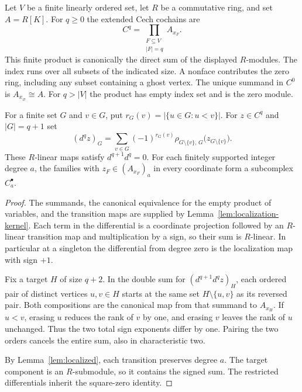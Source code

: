 \begin{lemma}\label{lem:cech-complex}
Let $V$ be a finite linearly ordered set, let $R$ be a commutative ring,
and set $A=R[K]$. For $q\geq0$ the extended Cech cochains are
\[
 C^q=\prod_{\substack{F\subseteq V\\ |F|=q}} A_{x_F}.
\]
This finite product is canonically the direct sum of the displayed
$R$-modules. The index runs over all subsets of the indicated size.
A nonface contributes the zero ring, including any subset containing a
ghost vertex. The unique summand in $C^0$ is $A_{x_\varnothing}\cong A$.
For $q>|V|$ the product has empty index set and is the zero module.

For a finite set $G$ and $v\in G$, put
$r_G(v)=|\{u\in G:u<v\}|$. For $z\in C^q$ and $|G|=q+1$ set
\[
 (d^q z)_G=\sum_{v\in G}(-1)^{r_G(v)}
    \rho_{G\setminus\{v\},\,G}\bigl(z_{G\setminus\{v\}}\bigr).
\]
These $R$-linear maps satisfy $d^{q+1}d^q=0$. For each finitely supported
integer degree $a$, the families with $z_F\in(A_{x_F})_a$ in every
coordinate form a subcomplex $C^\bullet_a$.
\leanok
\end{lemma}
\begin{proof}
The summands, the canonical equivalence for the empty product of variables,
and the transition maps are supplied by Lemma~\ref{lem:localization-kernel}.
Each term in the differential is a coordinate projection followed by an
$R$-linear transition map and multiplication by a sign, so their sum is
$R$-linear. In particular at a singleton the differential from degree zero
is the localization map with sign $+1$.

Fix a target $H$ of size $q+2$. In the double sum for $(d^{q+1}d^qz)_H$,
each ordered pair of distinct vertices $u,v\in H$ starts at the same set
$H\setminus\{u,v\}$ as its reversed pair. Both compositions are the
canonical map from that summand to $A_{x_H}$. If $u<v$, erasing $u$
reduces the rank of $v$ by one, and erasing $v$ leaves the rank of $u$
unchanged. Thus the two total sign exponents differ by one. Pairing the
two orders cancels the entire sum, also in characteristic two.

By Lemma~\ref{lem:localized}, each transition preserves degree $a$.
The target component is an $R$-submodule, so it contains the signed sum.
The restricted differentials inherit the square-zero identity.
\end{proof}

